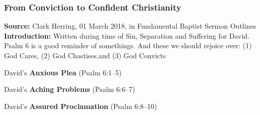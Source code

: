 \subsubsection{From Conviction to Confident Christianity}
\textbf{Source: } Clark Herring, 01 March 2018, in Fundamental Baptist Sermon Outlines\\
\textbf{Introduction: } Written during time of Sin, Separation and Suffering for David. Psalm 6 is a good reminder of somethings. And these we should rejoice over: (1) God Cares,
(2) God Chastises,and (3) God Convicts
\begin{compactenum}[I.]
    \item David’s \textbf{ Anxious Plea}   (Psalm 6:1--5)
    \item David’s \textbf{Aching Problems}   (Psalm 6:6--7)
    \item David’s \textbf{Assured Proclamation}   (Psalm 6:8--10)
\end{compactenum}